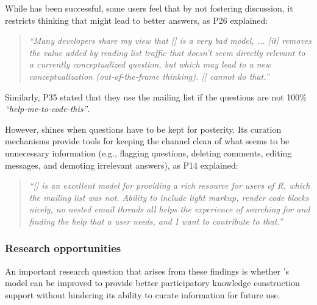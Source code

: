 While \SO has been successful, some users feel that by not fostering discussion, it restricts thinking that might lead to better answers, as P26 explained:
    \begin{quote}
        \textit{``Many developers share my view that [\SO] is a very bad model, ... [it] removes the value added by reading list traffic that doesn't seem directly relevant to a currently conceptualized question, but which may lead to a new conceptualization (out-of-the-frame thinking). [\SO] cannot do that.''}
    \end{quote}
    Similarly, P35 stated that they use the \RH mailing list if the questions are not 100\% \textit{``help-me-to-code-this''}.

    However, \SO shines when questions have to be kept for posterity. 
    Its curation mechanisms provide tools for keeping the channel clean of what seems to be unnecessary information (e.g., flagging questions, deleting comments, editing messages, and demoting irrelevant answers), as P14 explained:

    \begin{quote}
        \textit{``[\SO] is an excellent model for providing a rich resource for users of R, which the \RH mailing list was not. 
        Ability to include light markup, render code blocks nicely, no nested email threads all helps the experience of searching for and finding the help that a user needs, and I want to contribute to that.''}
    \end{quote}


\subsubsection{Research opportunities}

An important research question that arises from these findings is whether \SO's model can be improved to provide better participatory knowledge construction support without hindering its ability to curate information for future use.

